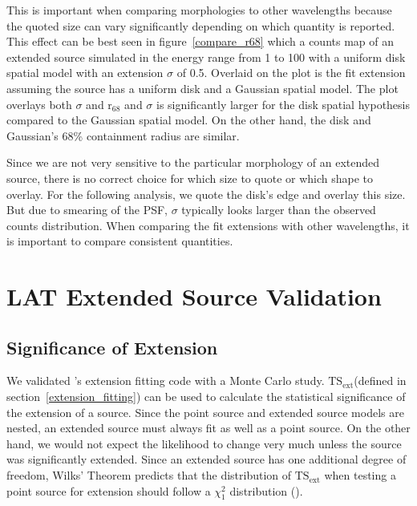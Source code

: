 \documentclass[12pt,preprint]{aastex}
\newcommand{\gev}{\text{GeV}\xspace}
\newcommand{\tsext}{{\ensuremath{\text{TS}_\text{ext}}}\xspace}
\newcommand{\rsixeight}{{\ensuremath{\text{r}_{68}}}\xspace}
\newcommand{\pointlike}{\text{\em pointlike}\xspace}
\begin{document}
This is important when comparing morphologies to other wavelengths
because the quoted size can vary significantly depending on which quantity
is reported.  This effect can be best seen in figure~\ref{compare_r68}
which a counts map of an extended source simulated in the energy
range from 1 \gev to 100 \gev with a uniform disk spatial model with
an extension $\sigma$ of 0.5. Overlaid on the plot is the fit extension
assuming the source has a uniform disk and a Gaussian spatial model. The
plot overlays both $\sigma$ and $\rsixeight$ and $\sigma$ is significantly
larger for the disk spatial hypothesis compared to the Gaussian spatial
model. On the other hand, the disk and Gaussian's 68\% containment radius
are similar.

Since we are not very sensitive to the particular morphology of an
extended source, there is no correct choice for which size to quote
or which shape to overlay. For the following analysis, we quote the
disk's edge and overlay this size.  But due to smearing of the PSF,
$\sigma$ typically looks larger than the observed counts distribution.
When comparing the fit extensions with other wavelengths, it is important
to compare consistent quantities.


\section{LAT Extended Source Validation}


\subsection{Significance of Extension}
\label{monte_carlo_validation}

We validated \pointlike's extension fitting code with a Monte Carlo
study. \tsext (defined in section~\ref{extension_fitting}) can be used to calculate the statistical significance
of the extension of a source.  Since the point source and extended source models are
nested, an extended source must always fit as well as a point source.  On the other hand, we would
not expect the likelihood to change very much unless the source was
significantly extended.  Since an extended source has one additional
degree of freedom, Wilks' Theorem predicts that the distribution of $\tsext$
when testing a point source for extension should follow a $\chi^2_1$
distribution (\cite{wilks_theorem}).
\end{document}
